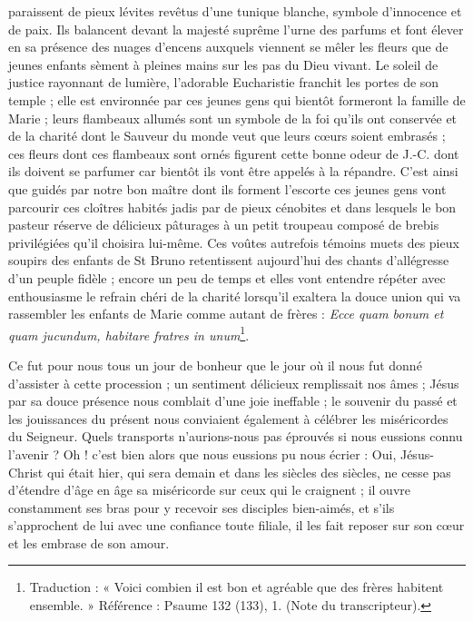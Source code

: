 paraissent de pieux lévites revêtus d'une tunique blanche, symbole d'innocence et de paix. Ils balancent devant la majesté suprême l'urne des parfums et font élever en sa présence des nuages d'encens auxquels viennent se mêler les fleurs que de jeunes enfants sèment à pleines mains sur les pas du Dieu vivant. Le soleil de justice rayonnant de lumière, l'adorable Eucharistie franchit les portes de son temple ; elle est environnée par ces jeunes gens qui bientôt formeront la famille de Marie ; leurs flambeaux allumés sont un symbole de la foi qu'ils ont conservée et de la charité dont le Sauveur du monde veut que leurs cœurs soient embrasés ; ces fleurs dont ces flambeaux sont ornés figurent cette bonne odeur de J.-C. dont ils doivent se parfumer car bientôt ils vont être appelés à la répandre. C'est ainsi que guidés par notre bon maître dont ils forment l'escorte ces jeunes gens vont parcourir ces cloîtres habités jadis par de pieux cénobites et dans lesquels le bon pasteur réserve de délicieux pâturages à un petit troupeau composé de brebis privilégiées qu'il choisira lui-même. Ces voûtes autrefois témoins muets des pieux soupirs des enfants de St Bruno retentissent aujourd'hui des chants d'allégresse d'un peuple fidèle ; encore un peu de temps et elles vont entendre répéter avec enthousiasme le refrain chéri de la charité lorsqu'il exaltera la douce union qui va rassembler les enfants de Marie comme autant de frères : \textit{Ecce quam bonum et quam jucundum,
habitare fratres in unum}\footnote{Traduction : « Voici combien il est bon et agréable que des frères habitent ensemble. » Référence : Psaume 132 (133), 1. (Note du transcripteur).}.

Ce fut pour nous tous un jour de bonheur que le jour où il nous fut donné d'assister à cette procession ; un sentiment délicieux remplissait nos âmes ; Jésus par sa douce présence nous comblait d'une joie ineffable ; le souvenir du passé et les jouissances du présent nous conviaient également à célébrer les miséricordes du Seigneur. Quels transports n'aurions-nous pas éprouvés si nous eussions connu l'avenir ? Oh ! c'est bien alors que nous eussions pu nous écrier : Oui, Jésus-Christ qui était hier, qui sera demain et dans les siècles des siècles, ne cesse pas d'étendre d'âge en âge sa miséricorde sur ceux qui le craignent ; il ouvre constamment ses bras pour y recevoir ses disciples bien-aimés, et s'ils s'approchent de lui avec une confiance toute filiale, il les fait reposer sur son cœur et les embrase de son amour.

